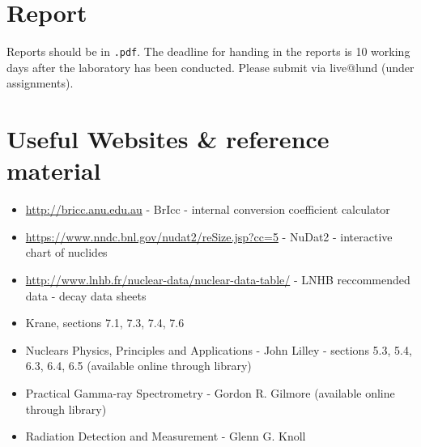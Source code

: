 \documentclass[12pt]{article}
\begin{document}
\section*{Report}
Reports should be in \texttt{.pdf}. The deadline for handing in the reports is 10 working days after the laboratory has been conducted.
Please submit via live@lund (under assignments).

\section*{Useful Websites \& reference material}
\begin{itemize}
    \item \href{http://bricc.anu.edu.au}{http://bricc.anu.edu.au} - BrIcc - internal conversion coefficient calculator
    \item \href{https://www.nndc.bnl.gov/nudat2/reSize.jsp?cc=5}{https://www.nndc.bnl.gov/nudat2/reSize.jsp?cc=5} - NuDat2 - interactive chart of nuclides
    \item \href{http://www.lnhb.fr/nuclear-data/nuclear-data-table}{http://www.lnhb.fr/nuclear-data/nuclear-data-table/} - LNHB reccommended data - decay data sheets
    \item Krane, sections 7.1, 7.3, 7.4, 7.6
    \item Nuclears Physics, Principles and Applications - John Lilley - sections 5.3, 5.4, 6.3, 6.4, 6.5 (available online through library)
    \item Practical Gamma-ray Spectrometry - Gordon R. Gilmore (available online through library)
    \item Radiation Detection and Measurement - Glenn G. Knoll
\end{itemize}
\end{document}
